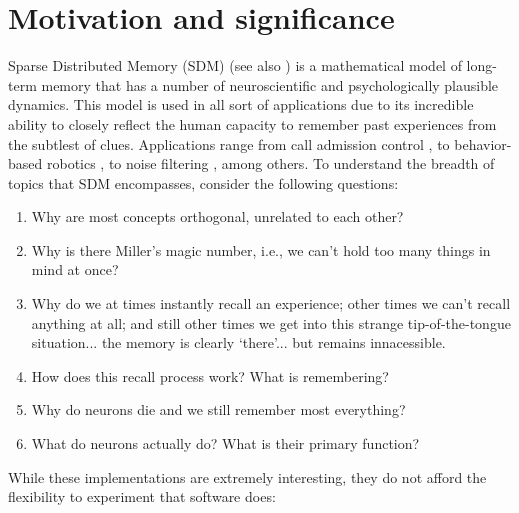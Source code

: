 \documentclass[preprint,12pt, a4paper]{elsarticle}
\begin{document}
\section{Motivation and significance}
\label{}

Sparse Distributed Memory (SDM) \citep{Kanerva1988} (see also \citep{denning_sparse_1989,  flynn_sparse_1989, kanerva_sparse_1993, kanerva_parallel_1985, goos_binary_1996, kanerva_hyperdimensional_2009,  keeler_comparison_1988, rwcp_fully_1997, marinaro_spatter_1994, sahlgren_permutations_nodate, uesaka_foundations_2001}) is a mathematical model of long-term memory that has a number of neuroscientific and psychologically plausible dynamics. This model is used in all sort of applications due to its incredible ability to closely reflect the human capacity to remember past experiences from the subtlest of clues. Applications range from call admission control \citep{kwon_atm_1998, hee-yong_kwon_atm_1997}, to behavior-based robotics \citep{Rajesh1998, mendes2008robot, jockel_sparse_2009}, to noise filtering \citep{meng_modified_2009}, among others.  To understand the breadth of topics that SDM encompasses, consider the following questions:

\begin{enumerate}
    \item Why are most concepts orthogonal, unrelated to each other?
    \item Why is there Miller's magic number, i.e., we can't hold too many things in mind at once?
    \item Why do we at times instantly recall an experience; other times we can't recall anything at all; and still other times we get into this strange tip-of-the-tongue situation... the memory is clearly `there'... but remains innacessible.
    \item How does this recall process work?  What is remembering?
    \item Why do neurons die and we still remember most everything?
    \item What do neurons actually do?  What is their primary function?
\end{enumerate}

While these implementations are extremely interesting, they do not afford the flexibility to experiment that software does:
\end{document}
